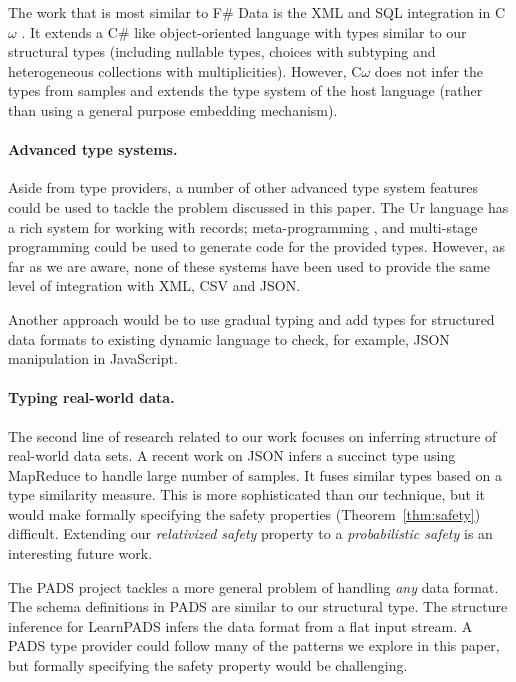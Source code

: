 \documentclass[10pt,preprint,clearpagebib]{sigplanconf}
\begin{document}
The work that is most similar to F\# Data is the XML and SQL integration in C$\omega$ \cite{comega-xs}.
It extends a C\# like object-oriented language with types similar to our structural types 
(including nullable types, choices with subtyping and heterogeneous collections with multiplicities).
However, C$\omega$ does not infer the types from samples and extends the type system of the host
language (rather than using a general purpose embedding mechanism).

\paragraph{Advanced type systems.}
Aside from type providers, a number of other advanced type system features could be used to
tackle the problem discussed in this paper. The Ur \cite{ur} language has a rich system for working
with records; meta-programming \cite{template-hask}, \cite{th-camlp4} and multi-stage programming \cite{multi-stage}
could be used to generate code for the provided types. However, as far as we are aware, none of these 
systems have been used to provide the same level of integration with XML, CSV and JSON.

Another approach would be to use gradual typing \cite{gradual,gradual-js} and add types for structured
data formats to existing dynamic language to check, for example, JSON manipulation in JavaScript.

\paragraph{Typing real-world data.}
The second line of research related to our work focuses on inferring structure of real-world data sets.
A recent work on JSON \cite{typing-json} infers a succinct type using MapReduce to handle large number
of samples. It fuses similar types based on a type similarity measure. This is more sophisticated than
our technique, but it would make formally specifying the safety properties (Theorem~\ref{thm:safety}) difficult.
Extending our \emph{relativized safety} property to a \emph{probabilistic safety} is an interesting 
future work.

The PADS project \cite{pads-dsl,pads-ml} tackles a more general problem of handling \emph{any} data format.
The schema definitions in PADS are similar to our structural type. The structure inference for LearnPADS
\cite{pads-learn} infers the data format from a flat input stream. A PADS type provider could follow
many of the patterns we explore in this paper, but formally specifying the safety property would be
challenging.
\end{document}
